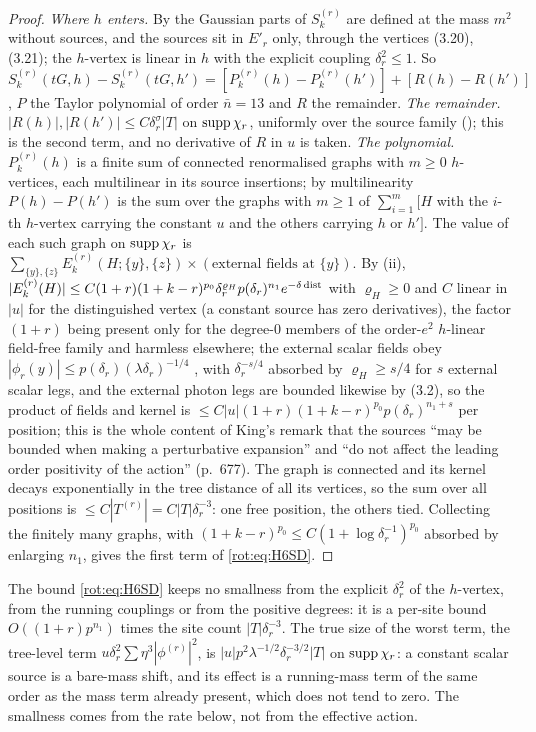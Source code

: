 \begin{proof}
\emph{Where $h$ enters.} By \cite[(3.14)--(3.17)]{K1} the Gaussian parts of $S^{(r)}_k$ are defined at the mass $m^2$ without sources, and the sources sit in $E'_r$ only, through the vertices (3.20), (3.21); the $h$-vertex is linear in $h$ with the explicit coupling $\delta_r^2\le1$. So $S^{(r)}_k(tG,h)-S^{(r)}_k(tG,h')=[P^{(r)}_k(h)-P^{(r)}_k(h')]+[R(h)-R(h')]$, $P$ the Taylor polynomial of order $\bar n=13$ and $R$ the remainder.
\emph{The remainder.} $|R(h)|,|R(h')|\le C\delta_r^\sigma|T|$ on $\operatorname{supp}\chi_r$, uniformly over the source family (\cite[p.~665]{K1}); this is the second term, and no derivative of $R$ in $u$ is taken.
\emph{The polynomial.} $P^{(r)}_k(h)$ is a finite sum of connected renormalised graphs with $m\ge0$ $h$-vertices, each multilinear in its source insertions; by multilinearity $P(h)-P(h')$ is the sum over the graphs with $m\ge1$ of $\sum_{i=1}^m[H$ with the $i$-th $h$-vertex carrying the constant $u$ and the others carrying $h$ or $h']$. The value of each such graph on $\operatorname{supp}\chi_r$ is $\sum_{\{y\},\{z\}}E^{(r)}_k(H;\{y\},\{z\})\times(\text{external fields at }\{y\})$. By (ii), $|E^{(r)}_k(H)|\le C(1+r)(1+k-r)^{p_0}\delta_r^{\varrho_H}p(\delta_r)^{n_1}e^{-\delta\operatorname{dist}}$ with $\varrho_H\ge0$ and $C$ linear in $|u|$ for the distinguished vertex (a constant source has zero derivatives), the factor $(1+r)$ being present only for the degree-$0$ members of the order-$e^2$ $h$-linear field-free family and harmless elsewhere; the external scalar fields obey $|\phi_r(y)|\le p(\delta_r)(\lambda\delta_r)^{-1/4}$ \cite[(3.2)]{K1}, with $\delta_r^{-s/4}$ absorbed by $\varrho_H\ge s/4$ for $s$ external scalar legs, and the external photon legs are bounded likewise by (3.2), so the product of fields and kernel is $\le C|u|(1+r)(1+k-r)^{p_0}p(\delta_r)^{n_1+s}$ per position; this is the whole content of King's remark that the sources ``may be bounded when making a perturbative expansion'' and ``do not affect the leading order positivity of the action'' (p.~677). The graph is connected and its kernel decays exponentially in the tree distance of all its vertices, so the sum over all positions is $\le C|T^{(r)}|=C|T|\delta_r^{-3}$: one free position, the others tied. Collecting the finitely many graphs, with $(1+k-r)^{p_0}\le C(1+\log\delta_r^{-1})^{p_0}$ absorbed by enlarging $n_1$, gives the first term of \eqref{rot:eq:H6SD}.
\end{proof}

The bound \eqref{rot:eq:H6SD} keeps no smallness from the explicit $\delta_r^2$ of the $h$-vertex, from the running couplings or from the positive degrees: it is a per-site bound $O((1+r)p^{n_1})$ times the site count $|T|\delta_r^{-3}$. The true size of the worst term, the tree-level term $u\delta_r^2\sum\eta^3|\phi^{(r)}|^2$, is $|u|p^2\lambda^{-1/2}\delta_r^{-3/2}|T|$ on $\operatorname{supp}\chi_r$: a constant scalar source is a bare-mass shift, and its effect is a running-mass term of the same order as the mass term already present, which does not tend to zero. The smallness comes from the rate below, not from the effective action.

